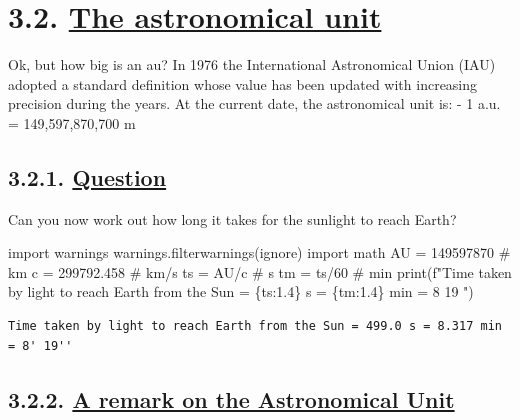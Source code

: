 \documentclass[
  letterpaper,
  DIV=11,
  numbers=noendperiod]{scrreprt}
\newenvironment{Shaded}{\begin{snugshade}}{\end{snugshade}}
\newcommand{\BuiltInTok}[1]{\textcolor[rgb]{0.00,0.23,0.31}{#1}}
\newcommand{\CommentTok}[1]{\textcolor[rgb]{0.37,0.37,0.37}{#1}}
\newcommand{\DecValTok}[1]{\textcolor[rgb]{0.68,0.00,0.00}{#1}}
\newcommand{\FloatTok}[1]{\textcolor[rgb]{0.68,0.00,0.00}{#1}}
\newcommand{\ImportTok}[1]{\textcolor[rgb]{0.00,0.46,0.62}{#1}}
\newcommand{\NormalTok}[1]{\textcolor[rgb]{0.00,0.23,0.31}{#1}}
\newcommand{\OperatorTok}[1]{\textcolor[rgb]{0.37,0.37,0.37}{#1}}
\newcommand{\SpecialCharTok}[1]{\textcolor[rgb]{0.37,0.37,0.37}{#1}}
\newcommand{\SpecialStringTok}[1]{\textcolor[rgb]{0.13,0.47,0.30}{#1}}
\newcommand{\StringTok}[1]{\textcolor[rgb]{0.13,0.47,0.30}{#1}}
\begin{document}
\hypertarget{the-astronomical-unit}{%
\section{\texorpdfstring{3.2. \protect\hyperlink{toc0_}{The astronomical
unit}}{3.2. The astronomical unit}}\label{the-astronomical-unit}}

Ok, but how big is an au? In 1976 the International Astronomical Union
(IAU) adopted a standard definition whose value has been updated with
increasing precision during the years. At the current date, the
astronomical unit is: - 1 a.u. = 149,597,870,700 m

\hypertarget{question}{%
\subsection{\texorpdfstring{3.2.1.
\protect\hyperlink{toc0_}{Question}}{3.2.1. Question}}\label{question}}

Can you now work out how long it takes for the sunlight to reach Earth?

\begin{Shaded}
\begin{Highlighting}[]
\ImportTok{import}\NormalTok{ warnings}
\NormalTok{warnings.filterwarnings(}\StringTok{\textquotesingle{}ignore\textquotesingle{}}\NormalTok{)}
\ImportTok{import}\NormalTok{ math}
\NormalTok{AU }\OperatorTok{=} \DecValTok{149597870} \CommentTok{\# km}
\NormalTok{c }\OperatorTok{=} \FloatTok{299792.458} \CommentTok{\# km/s}
\NormalTok{ts }\OperatorTok{=}\NormalTok{ AU}\OperatorTok{/}\NormalTok{c }\CommentTok{\# s}
\NormalTok{tm }\OperatorTok{=}\NormalTok{ ts}\OperatorTok{/}\DecValTok{60} \CommentTok{\# min}
\BuiltInTok{print}\NormalTok{(}\SpecialStringTok{f"Time taken by light to reach Earth from the Sun = }\SpecialCharTok{\{}\NormalTok{ts}\SpecialCharTok{:1.4\}}\SpecialStringTok{ s = }\SpecialCharTok{\{}\NormalTok{tm}\SpecialCharTok{:1.4\}}\SpecialStringTok{ min = 8\textquotesingle{} 19\textquotesingle{}\textquotesingle{} "}\NormalTok{)}
\end{Highlighting}
\end{Shaded}

\begin{verbatim}
Time taken by light to reach Earth from the Sun = 499.0 s = 8.317 min = 8' 19'' 
\end{verbatim}

\hypertarget{a-remark-on-the-astronomical-unit}{%
\subsection{\texorpdfstring{3.2.2. \protect\hyperlink{toc0_}{A remark on
the Astronomical
Unit}}{3.2.2. A remark on the Astronomical Unit}}\label{a-remark-on-the-astronomical-unit}}
\end{document}
